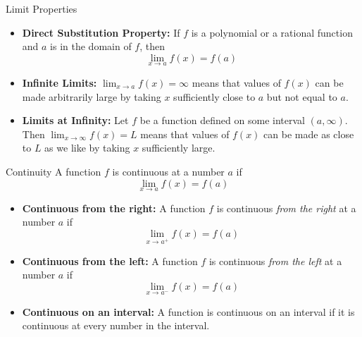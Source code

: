 \documentclass[]{beamer}
\begin{document}
    \begin{frame}{Limit Properties}
        \begin{itemize}
            \item<2->\textbf{Direct Substitution Property:}
            If $f$ is a polynomial or a rational function and $a$ is in the domain of $f$, then 
                \begin{equation*}
                    \lim_{x \to a} f(x) = f(a)
                \end{equation*}

            \item<3->\textbf{Infinite Limits:} $\lim_{x \to a} f(x) = \infty$ means that values of $f(x)$ can be made arbitrarily large by taking $x$ sufficiently close to $a$ but not equal to $a$.

            \item<4->\textbf{Limits at Infinity:} Let $f$ be a function defined on some interval $(a, \infty)$. Then $\lim_{x \to \infty} f(x) =L$ means that values of $f(x)$ can be made as close to $L$ as we like by taking $x$ sufficiently large. 
            \end{itemize}
        \end{frame}

    \begin{frame}{Continuity}
        A function $f$ is continuous at a number $a$ if
                \begin{equation*}
                    \lim_{x \to a} f(x) = f(a)
                \end{equation*}
            \begin{itemize}
                \item<3->\textbf{Continuous from the right:}
                    A function $f$ is continuous \textit{from the right} at a number $a$ if
                    \begin{equation*}
                        \lim_{x \to a^+} f(x) = f(a)
                    \end{equation*}
                \item<4->\textbf{Continuous from the left:}
                    A function $f$ is continuous \textit{from the left} at a number $a$ if
                    \begin{equation*}
                        \lim_{x \to a^-} f(x) = f(a)
                    \end{equation*}
                \item<5->\textbf{Continuous on an interval:}
                    A function is continuous on an interval if it is continuous at every number in the interval.
            \end{itemize}
    \end{frame}
\end{document}

